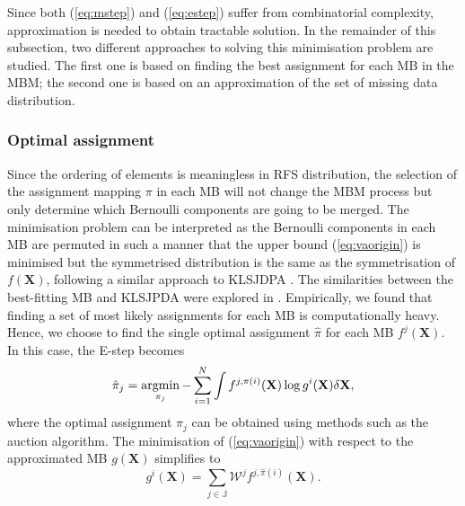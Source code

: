 \documentclass[conference]{IEEEtran}
\begin{document}
Since both (\ref{eq:mstep}) and (\ref{eq:estep}) suffer from combinatorial complexity, approximation is needed to obtain tractable solution. In the remainder of this subsection, two different approaches to solving this minimisation problem are studied. The first one is based on finding the best assignment for each MB in the MBM; the second one is based on an approximation of the set of missing data distribution.
\subsubsection{Optimal assignment}
Since the ordering of elements is meaningless in RFS distribution, the selection of the assignment mapping $\pi$ in each MB will not change the MBM process but only determine which Bernoulli components are going to be merged. The minimisation problem can be interpreted as the Bernoulli components in each MB are permuted in such a manner that the upper bound (\ref{eq:vaorigin}) is minimised but the symmetrised distribution is the same as the symmetrisation of $f(\mathbf{X})$, following a similar approach to KLSJDPA \cite{sjpda}. The similarities between the best-fitting MB and KLSJPDA were explored in \cite{variational}. Empirically, we found that finding a set of most likely assignments for each MB is computationally heavy. Hence, we choose to find the single optimal assignment $\hat{\pi}$ for each MB $f^j(\mathbf{X})$. In this case, the E-step becomes
\begin{equation}
    \hat{\pi}_j = \operatornamewithlimits{argmin}_{\pi_j}-\sum_{i=1}^N\int f^{j,\pi(i)}(\mathbf{X})\log g^{i}(\mathbf{X})\delta \mathbf{X},
    \label{eq:estepoptimal}
\end{equation}
where the optimal assignment $\hat{\pi}_j$ can be obtained using methods such as the auction algorithm. The minimisation of (\ref{eq:vaorigin}) with respect to the approximated MB $g(\mathbf{X})$ simplifies to 
\begin{equation}
    g^i(\mathbf{X}) = \sum_{j\in\mathbb{J}}\mathcal{W}^jf^{j,\hat{\pi}(i)}(\mathbf{X}).
\end{equation}
\end{document}
